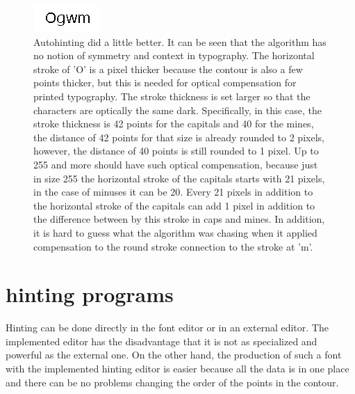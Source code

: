 \documentclass[a4paper]{article}
\begin{document}
\begin{enumerate}
\begin{figure} [H]
  \includegraphics [width =\linewidth]{pics/autohinting.png}
  \caption{Autohinting did a little better. It can be seen that the algorithm has no notion of symmetry and context in typography. The horizontal stroke of 'O' is a pixel thicker because the contour is also a few points thicker, but this is needed for optical compensation for printed typography. The stroke thickness is set larger so that the characters are optically the same dark. Specifically, in this case, the stroke thickness is 42 points for the capitals and 40 for the mines, the distance of 42 points for that size is already rounded to 2 pixels, however, the distance of 40 points is still rounded to 1 pixel. Up to 255 and more should have such optical compensation, because just in size 255 the horizontal stroke of the capitals starts with 21 pixels, in the case of minuses it can be 20. Every 21 pixels in addition to the horizontal stroke of the capitals can add 1 pixel in addition to the difference between by this stroke in caps and mines. In addition, it is hard to guess what the algorithm was chasing when it applied compensation to the round stroke connection to the stroke at 'm'. }
\end{figure}
\end{enumerate}

\section{hinting programs}
Hinting can be done directly in the font editor or in an external editor. The implemented editor has the disadvantage that it is not as specialized and powerful as the external one. On the other hand, the production of such a font with the implemented hinting editor is easier because all the data is in one place and there can be no problems changing the order of the points in the contour.
\end{document}
